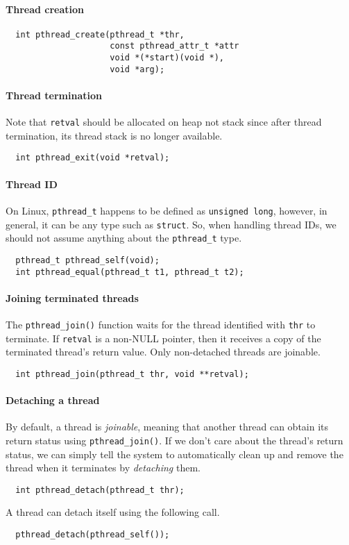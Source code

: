 \documentclass{memo}
\begin{document}
\paragraph{Thread creation}
\begin{verbatim}
  int pthread_create(pthread_t *thr, 
                     const pthread_attr_t *attr
                     void *(*start)(void *), 
                     void *arg);
\end{verbatim}

\paragraph{Thread termination}
Note that \verb+retval+ should be allocated on heap not stack since after
thread termination, its thread stack is no longer available.
\begin{verbatim}
  int pthread_exit(void *retval);
\end{verbatim}

\paragraph{Thread ID} On Linux, \verb+pthread_t+ happens to be
defined as \verb+unsigned long+, however, in general, it can be any type such
as \verb+struct+. So, when handling thread IDs, we should not assume anything
about the \verb+pthread_t+ type.
\begin{verbatim}
  pthread_t pthread_self(void);
  int pthread_equal(pthread_t t1, pthread_t t2);
\end{verbatim}

\paragraph{Joining terminated threads}
The \verb+pthread_join()+ function waits for the thread identified with
\verb+thr+ to terminate. If \verb+retval+ is a non-NULL pointer, then it
receives a copy of the terminated thread's return value. Only non-detached
threads are joinable.
\begin{verbatim}
  int pthread_join(pthread_t thr, void **retval);
\end{verbatim}

\paragraph{Detaching a thread} By default, a thread is {\em joinable\/},
meaning that another thread can obtain its return status using
\verb+pthread_join()+. If we don't care about the thread's return status, we
can simply  tell the system to automatically clean up and remove the thread
when it terminates by {\em detaching} them. 
\begin{verbatim}
  int pthread_detach(pthread_t thr);
\end{verbatim}
A thread can detach itself using the following call.
\begin{verbatim}
  pthread_detach(pthread_self());
\end{verbatim}
\end{document}
